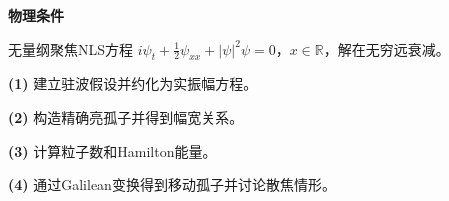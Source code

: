 \textbf{物理条件}\par 无量纲聚焦NLS方程 \(i\psi_t+\tfrac12\psi_{xx}+|\psi|^2\psi=0\)，\(x\in\mathbb R\)，解在无穷远衰减。
\par\noindent\textbf{(1)} 建立驻波假设并约化为实振幅方程。
\par\noindent\textbf{(2)} 构造精确亮孤子并得到幅宽关系。
\par\noindent\textbf{(3)} 计算粒子数和Hamilton能量。
\par\noindent\textbf{(4)} 通过Galilean变换得到移动孤子并讨论散焦情形。
